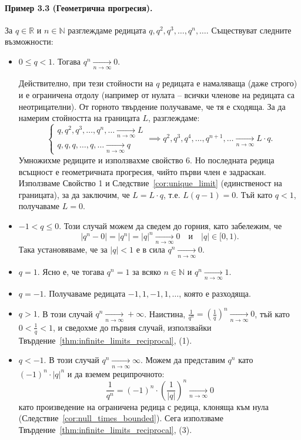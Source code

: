 \paragraph{Пример 3.3 (Геометрична прогресия).}
За $q \in \mathbb{R}$ и $n \in \mathbb{N}$ разглеждаме редицата $q, q^2, q^3, \dots, q^n, \dots$. Съществуват следните възможности:
\begin{itemize}
    \item $0 \le q < 1$. Тогава $q^n \xrightarrow[n\to\infty]{} 0$.
    
    Действително, при тези стойности на $q$ редицата е намаляваща (даже строго) и е ограничена отдолу (например от нулата -- всички членове на редицата са неотрицателни). От горното твърдение получаваме, че тя е сходяща. За да намерим стойността на границата $L$, разглеждаме:
    \[
    \begin{cases}
    q, q^2, q^3, \dots, q^n, \dots \xrightarrow[n\to\infty]{} L \\
    q, q, q, \dots, q, \dots \xrightarrow[n\to\infty]{} q
    \end{cases}
    \implies q^2, q^3, q^4, \dots, q^{n+1}, \dots \xrightarrow[n\to\infty]{} L \cdot q.
    \]
    Умножихме редиците и използвахме свойство 6. Но последната редица всъщност е геометричната прогресия, чийто първи член е задраскан. Използваме Свойство 1 и Следствие~\ref{cor:unique_limit} (единственост на границата), за да заключим, че $L = L \cdot q$, т.е. $L(q - 1) = 0$. Тъй като $q < 1$, получаваме $L = 0$.

    \item $-1 < q \le 0$. Този случай можем да сведем до горния, като забележим, че
    \[
    |q^n - 0| = |q^n| = |q|^n \xrightarrow[n\to\infty]{} 0 \quad \text{и} \quad |q| \in [0, 1).
    \]
    Така установяваме, че за $|q| < 1$ е в сила $q^n \xrightarrow[n\to\infty]{} 0$.

    \item $q = 1$. Ясно е, че тогава $q^n = 1$ за всяко $n \in \mathbb{N}$ и $q^n \xrightarrow[n\to\infty]{} 1$.

    \item $q = -1$. Получаваме редицата $-1, 1, -1, 1, \dots$, която е разходяща.

    \item $q > 1$. В този случай $q^n \xrightarrow[n\to\infty]{} +\infty$. Наистина, $\frac{1}{q^n} = \left(\frac{1}{q}\right)^n \xrightarrow[n\to\infty]{} 0$, тъй като $0 < \frac{1}{q} < 1$, и сведохме до първия случай, използвайки Твърдение~\ref{thm:infinite_limits_reciprocal}, (1).

    \item $q < -1$. В този случай $q^n \xrightarrow[n\to\infty]{} \infty$. Можем да представим $q^n$ като $(-1)^n \cdot |q|^n$ и да вземем реципрочното:
    \[
    \frac{1}{q^n} = (-1)^n \cdot \left(\frac{1}{|q|}\right)^n \xrightarrow[n\to\infty]{} 0
    \]
    като произведение на ограничена редица с редица, клоняща към нула (Следствие~\ref{cor:null_times_bounded}). Сега използваме Твърдение~\ref{thm:infinite_limits_reciprocal}, (3).
\end{itemize}

